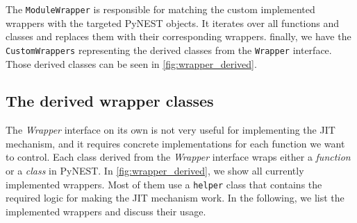 The \texttt{ModuleWrapper} is responsible for matching the custom implemented wrappers with the targeted PyNEST objects. It iterates over all functions and classes and replaces them with their corresponding wrappers. finally, we have the \texttt{CustomWrappers} representing the derived classes from the \texttt{Wrapper} interface. Those derived classes can be seen in \autoref{fig:wrapper_derived}.

\subsection{The derived wrapper classes}

The \emph{Wrapper} interface on its own is not very useful for implementing the JIT mechanism, and it requires concrete implementations for each function we want to control. Each class derived from the \emph{Wrapper} interface wraps either a \emph{function} or a \emph{class} in PyNEST. In \autoref{fig:wrapper_derived}, we show all currently implemented wrappers. Most of them use a \texttt{helper} class that contains the required logic for making the JIT mechanism work. In the following, we list the implemented wrappers and discuss their usage.

